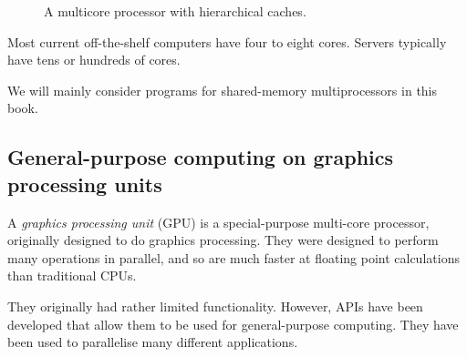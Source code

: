 \begin{figure}
\begin{center}
\end{center}
\caption{A multicore processor with hierarchical caches.}
\label{fig:multicore}
\end{figure}

Most current off-the-shelf computers have four to eight cores.  Servers
typically have tens or hundreds of cores.

We will mainly consider programs for shared-memory multiprocessors in this
book.
 


\subsection{General-purpose computing on graphics processing units}


A \emph{graphics processing unit} (GPU) is a special-purpose multi-core
processor, originally designed to do graphics processing.  They were designed
to perform many operations in parallel, and so are much faster at floating
point calculations than traditional
CPUs.

They originally had rather limited functionality.  However, APIs have
been developed that allow them to be used for general-purpose computing.  They
have been used to parallelise many different
applications.

